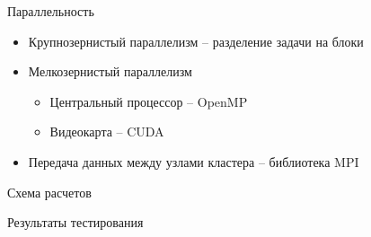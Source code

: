 \documentclass{beamer}
\begin{document}
\begin{frame}{Параллельность}
	\begin{itemize}
		\item Крупнозернистый параллелизм -- разделение задачи на блоки
		\item Мелкозернистый параллелизм
		\begin{itemize}
			\item Центральный процессор -- OpenMP
			\item Видеокарта -- CUDA
		\end{itemize}
		
		\item Передача данных между узлами кластера -- библиотека MPI
	\end{itemize}
\end{frame}






\begin{frame}{Схема расчетов}
	\begin{figure}[h]
		\label{ris:scheme}
	\end{figure}
\end{frame}





\begin{frame}{Результаты тестирования}
\end{frame}
\end{document}

